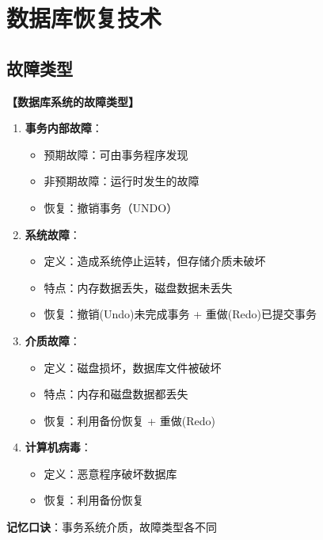 \documentclass[12pt, a4paper]{article}
\newenvironment{bluebox}[1]{%
  \begin{trivlist}
  \item[\hskip\labelsep \textbf{#1}]
  \setlength{\parskip}{0.5ex}
  \setlength{\itemsep}{0.5ex}
}{%
  \end{trivlist}
  }
\begin{document}
\section{数据库恢复技术}

\subsection{故障类型}

\begin{bluebox}{数据库故障分类}
	\textbf{【数据库系统的故障类型】}

	\begin{enumerate}[leftmargin=*, label=\textbf{\arabic*.}]
		\item \textbf{事务内部故障}：
		      \begin{itemize}[nosep]
			      \item 预期故障：可由事务程序发现
			      \item 非预期故障：运行时发生的故障
			      \item 恢复：撤销事务（UNDO）
		      \end{itemize}

		\item \textbf{系统故障}：
		      \begin{itemize}[nosep]
			      \item 定义：造成系统停止运转，但存储介质未破坏
			      \item 特点：内存数据丢失，磁盘数据未丢失
			      \item 恢复：撤销(Undo)未完成事务 + 重做(Redo)已提交事务
		      \end{itemize}

		\item \textbf{介质故障}：
		      \begin{itemize}[nosep]
			      \item 定义：磁盘损坏，数据库文件被破坏
			      \item 特点：内存和磁盘数据都丢失
			      \item 恢复：利用备份恢复 + 重做(Redo)
		      \end{itemize}

		\item \textbf{计算机病毒}：
		      \begin{itemize}[nosep]
			      \item 定义：恶意程序破坏数据库
			      \item 恢复：利用备份恢复
		      \end{itemize}
	\end{enumerate}

	\textbf{记忆口诀}：事务系统介质，故障类型各不同
\end{bluebox}
\end{document}
